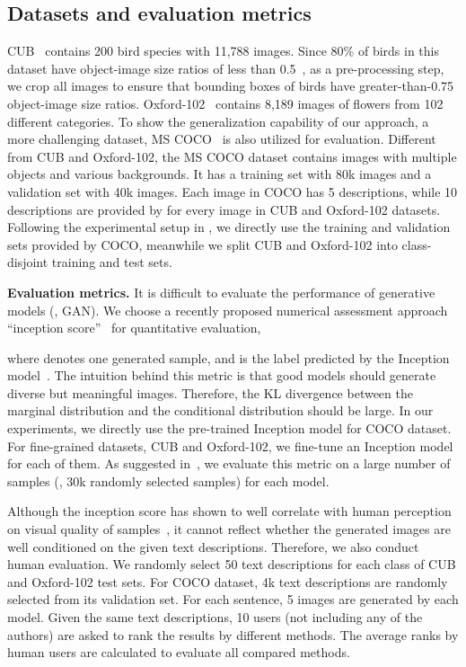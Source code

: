 \documentclass[10pt,twocolumn,letterpaper]{article}
\begin{document}
\vspace{-2pt}
\subsection{Datasets and evaluation metrics} 
\vspace{-5pt}

CUB~\cite{WahCUB_200_2011} contains 200 bird species with 11,788 images. Since 80\% of birds in this dataset have object-image size ratios of less than 0.5~\cite{WahCUB_200_2011}, as a pre-processing step, we crop all images to ensure that bounding boxes of birds have greater-than-0.75 object-image size ratios. Oxford-102~\cite{Nilsback08} contains 8,189 images of flowers from 102 different categories. To show the generalization capability of our approach, a more challenging dataset, MS COCO~\cite{LinMBHPRDZ14} is also utilized for evaluation. Different from CUB and Oxford-102, the MS COCO dataset contains images with multiple objects and various backgrounds. It has a training set with 80k images and a validation set with 40k images. Each image in COCO has 5 descriptions, while 10 descriptions are provided by \cite{reed2016cvpr} for every image in CUB and Oxford-102 datasets. Following the experimental setup in \cite{reed2016generative}, we directly use the training and validation sets provided by COCO, meanwhile we split CUB and Oxford-102 into class-disjoint training and test sets. 



\textbf{Evaluation metrics. }
It is difficult to evaluate the performance of generative models (\eg, GAN). We choose a recently proposed numerical assessment approach ``inception score''~\cite{Salimans2016} for quantitative evaluation,

where  denotes one generated sample, and  is the label predicted by the Inception model~\cite{Szegedy2016}. The intuition behind this metric is that good models should generate diverse but meaningful images. Therefore, the KL divergence between the marginal distribution  and the conditional distribution  should be large. In our experiments, we directly use the pre-trained Inception model for COCO dataset. For fine-grained datasets, CUB and Oxford-102, we fine-tune an Inception model for each of them. As suggested in~\cite{Salimans2016}, we evaluate this metric on a large number of samples (\ie, 30k randomly selected samples) for each model. 


Although the inception score has shown to well correlate with human perception on visual quality of samples~\cite{Salimans2016}, it cannot reflect whether the generated images are well conditioned on the given text descriptions. Therefore, we also conduct human evaluation. We randomly select 50 text descriptions for each class of CUB and Oxford-102 test sets. For COCO dataset, 4k text descriptions are randomly selected from its validation set. For each sentence, 5 images are generated by each model. Given the same text descriptions, 10 users (not including any of the authors) are asked to rank the results by different methods. The average ranks by human users are calculated to evaluate all compared methods.
\end{document}
